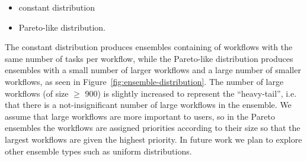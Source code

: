 \documentclass{sig-alternate}
\begin{document}
\begin{itemize}
  \item constant distribution
  \item Pareto-like distribution.
\end{itemize}

The constant distribution produces ensembles containing of workflows with the same number of tasks per workflow, 
while the Pareto-like distribution produces ensembles with a small number of larger 
workflows and a large number of smaller workflows, as seen in 
Figure~\ref{fig:ensemble-distribution}. The number of large workflows (of size $\geq$ 900) 
is slightly increased to represent the ``heavy-tail'', i.e. that there is a 
not-insignificant number of large workflows in the ensemble. We assume that large
workflows are more important to users, so in the Pareto ensembles the workflows are 
assigned priorities according to their size so that the largest workflows are given 
the highest priority. In
future work we plan to explore other ensemble types such as uniform distributions.
\end{document}
